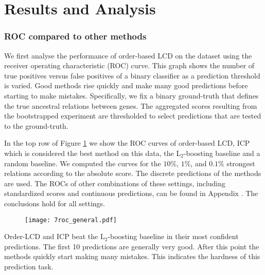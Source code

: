 \newpage
\section{Results and Analysis}
\label{chapter:analysis}






\subsubsection{ROC compared to other methods}

We first analyse the performance of order-based LCD on the \citet{kemmeren2014large} dataset using the receiver operating characteristic (ROC) curve. This graph shows the number of true positives versus false positives of a binary classifier as a prediction threshold is varied. Good methods rise quickly and make many good predictions before starting to make mistakes. Specifically, we fix a binary ground-truth that defines the true ancestral relations between genes. The aggregated scores resulting from the bootstrapped experiment are thresholded to select predictions that are tested to the ground-truth.

In the top row of Figure \ref{fig:7:rocgen} we show the ROC curves of order-based LCD, ICP which is considered the best method on this data, the L$_2$-boosting baseline and a random baseline. We computed the curves for the $10\%$, $1\%$, and $0.1\%$ strongest relations according to the absolute score. The discrete predictions of the methods are used. The ROCs of other combinations of these settings, including standardized scores and continuous predictions, can be found in Appendix . The conclusions hold for all settings.

\begin{figure}[h]
    \centering
    \texttt{[image: 7roc\_general.pdf]}
    \caption{}
    \label{fig:7:rocgen}
\end{figure}

Order-LCD and ICP beat the L$_2$-boosting baseline in their most confident predictions. The first 10 predictions are generally very good. After this point the methods quickly start making many mistakes. This indicates the hardness of this prediction task.

